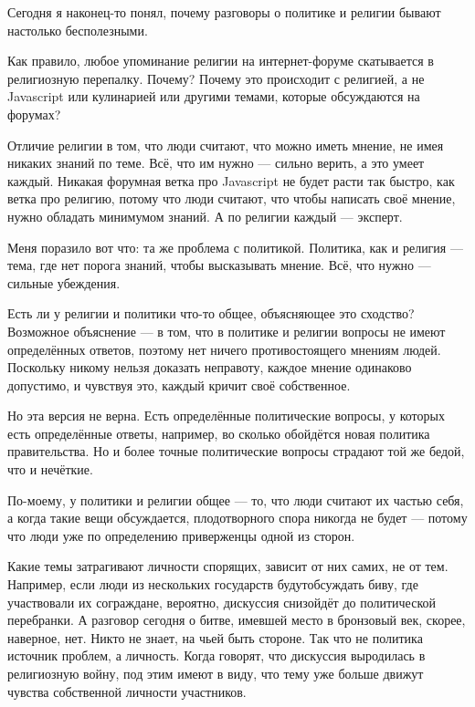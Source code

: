 \documentclass[ebook,12pt,oneside,openany]{memoir}
\begin{document}
\maketitle

Сегодня я наконец-то понял, почему разговоры о политике и религии
бывают настолько бесполезными.

Как правило, любое упоминание религии на интернет-форуме скатывается в
религиозную перепалку. Почему? Почему это происходит с религией, а не
Javascript или кулинарией или другими темами, которые обсуждаются на
форумах?

Отличие религии в том, что люди считают, что можно иметь мнение, не
имея никаких знаний по теме. Всё, что им нужно — сильно верить, а это
умеет каждый. Никакая форумная ветка про Javascript не будет расти так
быстро, как ветка про религию, потому что люди считают, что чтобы
написать своё мнение, нужно обладать минимумом знаний. А по религии
каждый — эксперт.

Меня поразило вот что: та же проблема с политикой. Политика, как и
религия — тема, где нет порога знаний, чтобы высказывать мнение. Всё,
что нужно — сильные убеждения.

Есть ли у религии и политики что-то общее, объясняющее это сходство?
Возможное объяснение — в том, что в политике и религии вопросы не
имеют определённых ответов, поэтому нет ничего противостоящего мнениям
людей. Поскольку никому нельзя доказать неправоту, каждое мнение
одинаково допустимо, и чувствуя это, каждый кричит своё собственное.

Но эта версия не верна. Есть определённые политические вопросы, у
которых есть определённые ответы, например, во сколько обойдётся новая
политика правительства. Но и более точные политические вопросы
страдают той же бедой, что и нечёткие.

По-моему, у политики и религии общее — то, что люди считают их частью
себя, а когда такие вещи обсуждается, плодотворного спора никогда не
будет — потому что люди уже по определению приверженцы одной из
сторон.

Какие темы затрагивают личности спорящих, зависит от них самих, не от
тем. Например, если люди из нескольких государств будутобсуждать биву,
где участвовали их сограждане, вероятно, дискуссия снизойдёт до
политической перебранки. А разговор сегодня о битве, имевшей место в
бронзовый век, скорее, наверное, нет. Никто не знает, на чьей быть
стороне. Так что не политика источник проблем, а личность. Когда
говорят, что дискуссия выродилась в религиозную войну, под этим имеют
в виду, что тему уже больше движут чувства собственной личности
участников.
\end{document}
